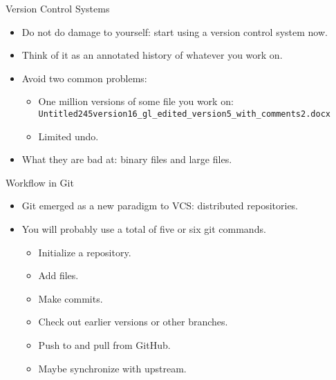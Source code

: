 \documentclass[compress,red]{beamer}\usetheme{Warsaw}\useoutertheme[subsection=false]{smoothbars}
\begin{document}
\begin{frame}[fragile]{Version Control Systems}
\begin{itemize}
\item Do not do damage to yourself: start using a version control system now.

\item Think of it as an annotated history of whatever you work on.

\item Avoid two common problems:
 \begin{itemize}
\item One million versions of some file you work on: {\scriptsize \verb+Untitled245version16_gl_edited_version5_with_comments2.docx+}

\item Limited undo.
\end{itemize}
\item What they are bad at: binary files and large files.
\end{itemize}
\end{frame}

\begin{frame}{Workflow in Git}
\begin{itemize}
\item Git emerged as a new paradigm to VCS: distributed repositories.
 
\item You will probably use a total of five or six git commands.
\begin{itemize}
  \item Initialize a repository.
  \item Add files.
  \item Make commits.
  \item Check out earlier versions or other branches.
  \item Push to and pull from GitHub.
  \item Maybe synchronize with upstream.
\end{itemize}
\end{itemize}
\end{frame}
\end{document}
